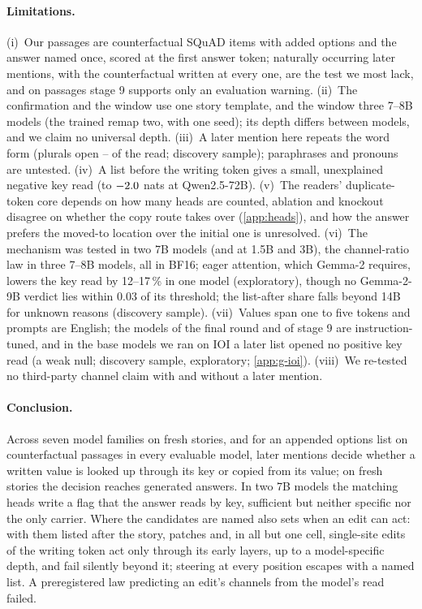 \paragraph{Limitations.}\label{sec:limitations}
(i)~Our passages are counterfactual SQuAD items with added options and the answer named once, scored at the first answer token; naturally occurring later mentions, with the counterfactual written at every one, are the test we most lack, and on passages stage 9 supports only an evaluation warning. (ii)~The confirmation and the window use one story template, and the window three 7--8B models (the trained remap two, with one seed); its depth differs between models, and we claim no universal depth. (iii)~A later mention here repeats the word form (plurals open \GfourteenPluralMin--\GfourteenPluralMax{} of the read; discovery sample); paraphrases and pronouns are untested. (iv)~A list before the writing token gives a small, unexplained negative key read (to $-2.0$ nats at Qwen2.5-72B). (v)~The readers' duplicate-token core depends on how many heads are counted, ablation and knockout disagree on whether the copy route takes over (\cref{app:heads}), and how the answer prefers the moved-to location over the initial one is unresolved. (vi)~The mechanism was tested in two 7B models (and at 1.5B and 3B), the channel-ratio law in three 7--8B models, all in BF16; eager attention, which Gemma-2 requires, lowers the key read by 12--17\,\% in one model (exploratory), though no Gemma-2-9B verdict lies within 0.03 of its threshold; the list-after share falls beyond 14B for unknown reasons (discovery sample). %
(vii)~Values span one to five tokens and prompts are English; the models of the final round and of stage 9 are instruction-tuned, and in the base models we ran on IOI a later list opened no positive key read (a weak null; discovery sample, exploratory; \cref{app:g-ioi}). (viii)~We re-tested no third-party channel claim with and without a later mention.

\paragraph{Conclusion.}
Across seven model families on fresh stories, and for an appended options list on counterfactual passages in every evaluable model, later mentions decide whether a written value is looked up through its key or copied from its value; on fresh stories the decision reaches generated answers. %
In two 7B models the matching heads write a flag that the answer reads by key, sufficient but neither specific nor the only carrier. Where the candidates are named also sets when an edit can act: with them listed after the story, patches and, in all but one cell, single-site edits of the writing token act only through its early layers, up to a model-specific depth, and fail silently beyond it; steering at every position escapes with a named list. A preregistered law predicting an edit's channels from the model's read failed.
